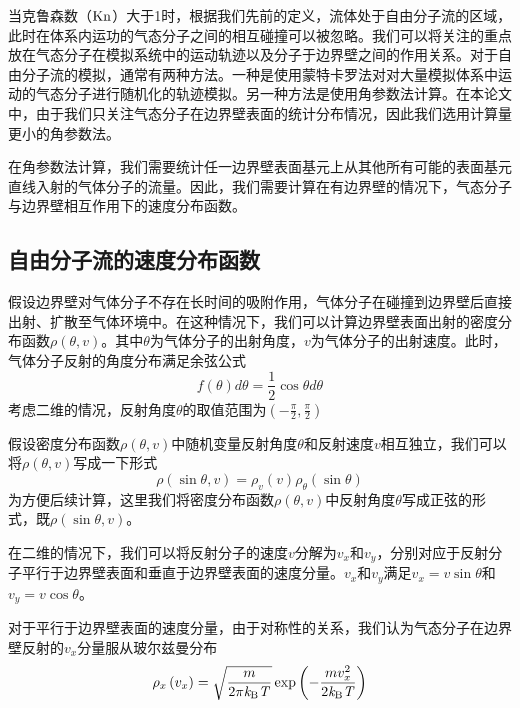     当克鲁森数（${\rm Kn}$）大于1时，根据我们先前的定义，流体处于自由分子流的区域，此时在体系内运功的气态分子之间的相互碰撞可以被忽略。我们可以将关注的重点放在气态分子在模拟系统中的运动轨迹以及分子于边界壁之间的作用关系。对于自由分子流的模拟，通常有两种方法。一种是使用蒙特卡罗法对对大量模拟体系中运动的气态分子进行随机化的轨迹模拟。另一种方法是使用角参数法计算。在本论文中，由于我们只关注气态分子在边界壁表面的统计分布情况，因此我们选用计算量更小的角参数法。

    在角参数法计算，我们需要统计任一边界壁表面基元上从其他所有可能的表面基元直线入射的气体分子的流量。因此，我们需要计算在有边界壁的情况下，气态分子与边界壁相互作用下的速度分布函数。
    
    \subsection{自由分子流的速度分布函数}

    假设边界壁对气体分子不存在长时间的吸附作用，气体分子在碰撞到边界壁后直接出射、扩散至气体环境中。在这种情况下，我们可以计算边界壁表面出射的密度分布函数$\rho\left(\theta, v\right)$。其中$\theta$为气体分子的出射角度，$v$为气体分子的出射速度。此时，气体分子反射的角度分布满足余弦公式\chinesecolon
    \begin{equation}
        f\left(\theta\right)d\theta =\frac{1}{2}\cos\theta d\theta 
    \end{equation}    
    考虑二维的情况，反射角度$\theta$的取值范围为$\left(-\frac{\pi}{2},\frac{\pi}{2}\right)$

    假设密度分布函数$\rho\left(\theta, v\right)$中随机变量反射角度$\theta$和反射速度$v$相互独立，我们可以将$\rho\left(\theta, v\right)$写成一下形式\chinesecolon
    \[
        \rho\left(\sin\theta,v\right)=\rho_v\left(v\right)\rho_\theta\left(\sin\theta\right)
    \]
    为方便后续计算，这里我们将密度分布函数$\rho\left(\theta, v\right)$中反射角度$\theta$写成正弦的形式，既$\rho(\sin\theta,v)$。

    在二维的情况下，我们可以将反射分子的速度$v$分解为$v_x$和$v_y$，分别对应于反射分子平行于边界壁表面和垂直于边界壁表面的速度分量。$v_x$和$v_y$满足$v_x=v\sin\theta$和$v_y=v\cos\theta$。

    对于平行于边界壁表面的速度分量，由于对称性的关系，我们认为气态分子在边界壁反射的$v_x$分量服从玻尔兹曼分布\chinesecolon
    \begin{equation}
        \label{eq:FM_vxDensity}
        \rho_x\left(v_x\right)=\sqrt{\frac{m}{2\pi\it k_{\rm B} \it T}}\exp\left({-\frac{mv_x^2}{2\it k_{\rm B} \it T}}\right)
    \end{equation}

